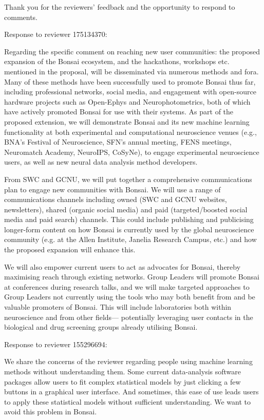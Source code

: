 \documentclass[11pt]{letter}
\begin{document}
\begin{letter}{
}

Thank you for the reviewers' feedback and the opportunity to respond to
comments.

Response to reviewer 175134370:

Regarding the specific comment on reaching new user communities: the proposed
expansion of the Bonsai ecosystem, and the hackathons, workshops etc. mentioned
in the proposal, will be disseminated via numerous methods and fora. Many of
these methods have been successfully used to promote Bonsai thus far, including
professional networks, social media, and engagement with open-source hardware
projects such as Open-Ephys and Neurophotometrics, both of which have actively
promoted Bonsai for use with their systems. As part of the proposed extension,
we will demonstrate Bonsai and its new machine learning functionality at both
experimental and computational neuroscience venues (e.g., BNA's Festival of
Neuroscience, SFN's annual meeting, FENS meetings, Neuromatch Academy,
NeuroIPS, CoSyNe), to engage experimental neuroscience users, as well as new
neural data analysis method developers.

From SWC and GCNU, we will put together a comprehensive communications plan to
engage new communities with Bonsai. We will use a range of communications
channels including owned (SWC and GCNU websites, newsletters), shared (organic
social media) and paid (targeted/boosted social media and paid search)
channels. This could include publishing and publicising longer-form content on
how Bonsai is currently used by the global neuroscience community (e.g. at the
Allen Institute, Janelia Research Campus, etc.) and how the proposed expansion
will enhance this.

We will also empower current users to act as advocates for Bonsai, thereby
maximising reach through existing networks. Group Leaders will promote Bonsai
at conferences during research talks, and we will make targeted approaches to
Group Leaders not currently using the tools who may both benefit from and be
valuable promoters of Bonsai. This will include laboratories both within
neuroscience and from other fields— potentially leveraging user contacts in the
biological and drug screening groups already utilising Bonsai.

\pagebreak

Response to reviewer 155296694:

We share the concerns of the reviewer regarding people using machine learning
methods without understanding them. Some current data-analysis software
packages allow users to fit complex statistical models by just clicking a few
buttons in a graphical user interface. And sometimes, this ease of use leads
users to apply these statistical models without sufficient understanding. We
want to avoid this problem in Bonsai.


\end{letter}
\end{document}
